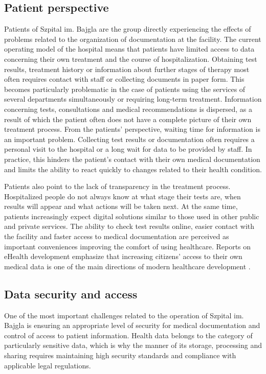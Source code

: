 \subsection{Patient perspective}
Patients of Szpital im. Bajgla are the group directly experiencing the effects of problems related to the organization of documentation at the facility. The current operating model of the hospital means that patients have limited access to data concerning their own treatment and the course of hospitalization. Obtaining test results, treatment history or information about further stages of therapy most often requires contact with staff or collecting documents in paper form.
This becomes particularly problematic in the case of patients using the services of several departments simultaneously or requiring long-term treatment. Information concerning tests, consultations and medical recommendations is dispersed, as a result of which the patient often does not have a complete picture of their own treatment process. From the patients' perspective, waiting time for information is an important problem. Collecting test results or documentation often requires a personal visit to the hospital or a long wait for data to be provided by staff. In practice, this hinders the patient's contact with their own medical documentation and limits the ability to react quickly to changes related to their health condition.

Patients also point to the lack of transparency in the treatment process. Hospitalized people do not always know at what stage their tests are, when results will appear and what actions will be taken next.
At the same time, patients increasingly expect digital solutions similar to those used in other public and private services. The ability to check test results online, easier contact with the facility and faster access to medical documentation are perceived as important conveniences improving the comfort of using healthcare. Reports on eHealth development emphasize that increasing citizens' access to their own medical data is one of the main directions of modern healthcare development \cite{EU_eHealth_2024}.
\subsection{Data security and access}
One of the most important challenges related to the operation of Szpital im. Bajgla is ensuring an appropriate level of security for medical documentation and control of access to patient information. Health data belongs to the category of particularly sensitive data, which is why the manner of its storage, processing and sharing requires maintaining high security standards and compliance with applicable legal regulations.

